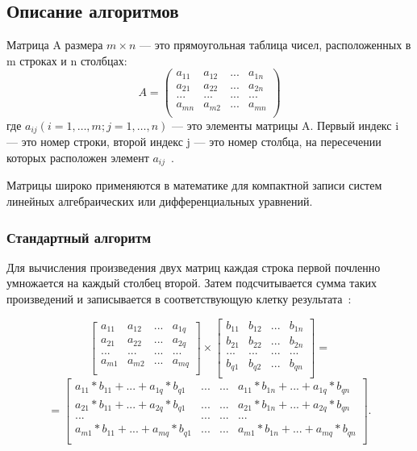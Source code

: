 \documentclass[a4paper,12pt]{article}
\begin{document}
 
	
	\subsection{Описание алгоритмов}
	Матрица A размера $m \times n$ — это прямоугольная таблица чисел, расположенных в m строках и n столбцах:
	\[A = \begin{pmatrix}
a_{11} & a_{12} & ... & a_{1n}\\
a_{21} & a_{22} & ... & a_{2n}\\
... & ... & ... & ...\\
a_{mn} & a_{m2} & ... & a_{mn}\\
\end{pmatrix} \]
 где $a_{ij} (i = 1, …, m; j =1, …, n)$ — это элементы матрицы A. Первый индекс i — это номер строки, второй индекс j — это номер столбца, на пересечении которых расположен элемент $a_{ij}$~\cite{matr}.
		    
		
	Матрицы широко применяются в математике для компактной записи систем линейных алгебраических или дифференциальных уравнений.
	
	    \subsubsection{Стандартный алгоритм}
	Для вычисления произведения двух матриц каждая строка первой
почленно умножается на каждый столбец второй. Затем подсчитывается сумма таких произведений и записывается в соответствующую клетку результата~\cite{makkonell}:

\[ \begin{bmatrix}
a_{11} & a_{12} & ... & a_{1q}\\
a_{21} & a_{22} & ... & a_{2q}\\
... & ... & ... & ...\\
a_{m1} & a_{m2} & ... & a_{mq}\\
\end{bmatrix} \times 
\begin{bmatrix}
b_{11} & b_{12} & ... & b_{1n}\\
b_{21} & b_{22} & ... & b_{2n}\\
... & ... & ... & ...\\
b_{q1} & b_{q2} & ... & b_{qn}\\
\end{bmatrix} = \]
\[=\begin{bmatrix}
a_{11}*b_{11} + ... + a_{1q}*b_{q1} & ... & ... & a_{11}*b_{1n} + ... + a_{1q}*b_{qn}\\
a_{21}*b_{11} + ... + a_{2q}*b_{q1} & ... & ... & a_{21}*b_{1n} + ... + a_{2q}*b_{qn}\\
... & ... & ... & ...\\
a_{m1}*b_{11} + ... + a_{mq}*b_{q1} & ... & ... & a_{m1}*b_{1n} + ... + a_{mq}*b_{qn}\\
\end{bmatrix}. \]
		     		
\end{document}
